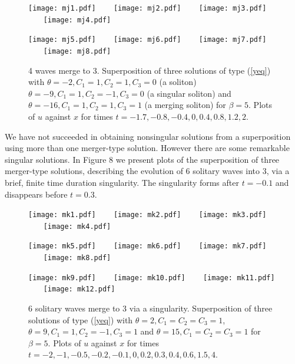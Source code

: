\documentclass[12pt]{article}
\begin{document}
\begin{figure}
      \centerline{
        \texttt{[image: mj1.pdf]} ~~~
        \texttt{[image: mj2.pdf]} ~~~
        \texttt{[image: mj3.pdf]} ~~~
        \texttt{[image: mj4.pdf]} 
        }
      \centerline{
        \texttt{[image: mj5.pdf]} ~~~
        \texttt{[image: mj6.pdf]} ~~~
        \texttt{[image: mj7.pdf]} ~~~
        \texttt{[image: mj8.pdf]} 
        }
      \caption{4 waves merge to 3. Superposition of three solutions of type (\ref{yeq}) with
        $\theta=-2,C_1=1,C_2=1,C_3=0$ (a soliton) 
        $\theta=-9,C_1=1,C_2=-1,C_3=0$ (a singular soliton) 
        and $\theta=-16,C_1=1,C_2=1,C_3=1$ (a merging soliton) 
        for $\beta=5$. Plots  of $u$ against $x$ for times $t=-1.7,-0.8,-0.4,0,0.4,0.8,1.2,2$. 
      }
\end{figure}

We have not succeeded in obtaining nonsingular solutions from a superposition using more than one merger-type
solution. However there are some remarkable singular solutions. In Figure 8 we present plots of the superposition of three
merger-type solutions, describing the evolution of 6 solitary waves into 3, via a brief, finite time duration 
singularity. The singularity forms after $t=-0.1$ and disappears before $t=0.3$. 

\begin{figure}
      \centerline{
        \texttt{[image: mk1.pdf]} ~~~
        \texttt{[image: mk2.pdf]} ~~~
        \texttt{[image: mk3.pdf]} ~~~
        \texttt{[image: mk4.pdf]} 
        }
      \centerline{
        \texttt{[image: mk5.pdf]} ~~~
        \texttt{[image: mk6.pdf]} ~~~
        \texttt{[image: mk7.pdf]} ~~~
        \texttt{[image: mk8.pdf]} 
        }
      \centerline{
        \texttt{[image: mk9.pdf]} ~~~
        \texttt{[image: mk10.pdf]} ~~~
        \texttt{[image: mk11.pdf]} ~~~
        \texttt{[image: mk12.pdf]} 
        }
      \caption{6 solitary waves merge to 3 via a singularity. Superposition of three solutions of type (\ref{yeq}) with
        $\theta=2,C_1=C_2=C_3=1$,  
        $\theta=9,C_1=1,C_2=-1,C_3=1$ 
        and $\theta=15,C_1=C_2=C_3=1$ 
        for $\beta=5$. Plots  of $u$ against $x$ for times $t=-2,-1,-0.5,-0.2,-0.1,0,0.2,0.3,0.4,0.6,1.5,4$. 
      }
\end{figure}
\end{document}
